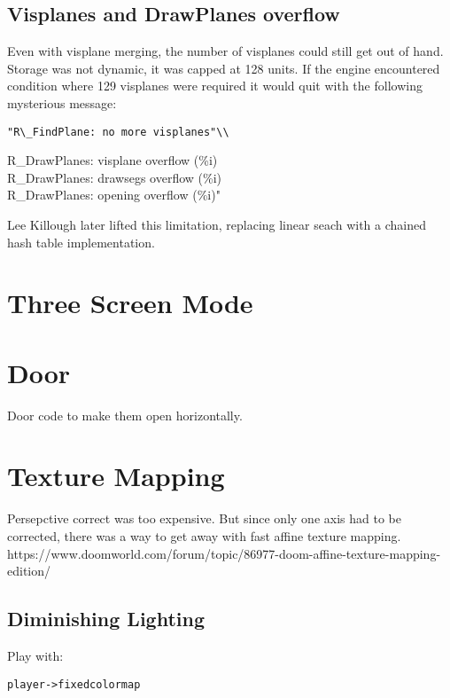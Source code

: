 \subsection{Visplanes and DrawPlanes overflow}
Even with visplane merging, the number of visplanes could still get out of hand. Storage was not dynamic, it was capped at 128 units. If the engine encountered condition where 129 visplanes were required it would quit with the following mysterious message:\\
\begin{verbatim}
"R\_FindPlane: no more visplanes"\\
\end{verbatim}
\par
R\_DrawPlanes: visplane overflow (\%i)\\
R\_DrawPlanes: drawsegs overflow (\%i)\\
R\_DrawPlanes: opening  overflow (\%i)"\\
\par

Lee Killough later lifted this limitation, replacing linear seach with a chained hash table implementation.

\section{Three Screen Mode}


\section{Door}
Door code to make them open horizontally.
\section{Texture Mapping}
Persepctive correct was too expensive. But since only one axis had to be corrected, there was a way to get away with fast affine texture mapping.\\
https://www.doomworld.com/forum/topic/86977-doom-affine-texture-mapping-edition/\\
\par

\subsection{Diminishing Lighting}
Play with:
\begin{verbatim}
player->fixedcolormap
\end{verbatim}
